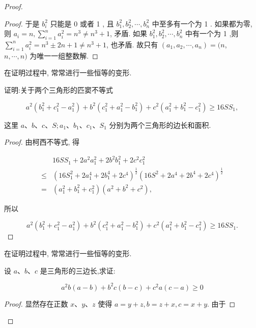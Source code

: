 \begin{proof}
\begin{proof}
	于是 $b_{i}^{2}$ 只能是 0 或者 1 , 且 $b_{1}^{2}, b_{2}^{2}, \cdots, b_{n}^{2}$ 中至多有一个为 1 . 如果都为零, 则 $a_{i}=n, \sum_{i=1}^{n} a_{i}^{2}=n^{3} \neq n^{3}+1$, 矛盾. 如果 $b_{1}^{2}, b_{2}^{2}, \cdots, b_{n}^{2}$ 中有一个为 1 ,则 $\sum_{i=1}^{n} a_{i}^{2}=n^{3} \pm 2 n+1 \neq n^{3}+1$, 也矛盾. 故只有 $\left(a_{1}, a_{2}, \cdots, a_{n}\right)=(n$,\\
	$n, \cdots, n)$ 为唯一一组整数解.
\end{proof}
\begin{note}
	在证明过程中, 常常进行一些恒等的变形.
\end{note}

\begin{example}
	证明:关于两个三角形的匹窦不等式
	
	$$
	a^{2}\left(b_{1}^{2}+c_{1}^{2}-a_{1}^{2}\right)+b^{2}\left(c_{1}^{2}+a_{1}^{2}-b_{1}^{2}\right)+c^{2}\left(a_{1}^{2}+b_{1}^{2}-c_{1}^{2}\right) \geqslant 16 S S_{1},
	$$
	
	这里 $a 、 b 、 c 、 S ; a_{1} 、 b_{1} 、 c_{1} 、 S_{1}$ 分别为两个三角形的边长和面积.
\end{example}
\begin{proof}
	由柯西不等式, 得
	
	$$
	\begin{aligned}
	& 16 S S_{1}+2 a^{2} a_{1}^{2}+2 b^{2} b_{1}^{2}+2 c^{2} c_{1}^{2} \\
	\leqslant & \left(16 S_{1}^{2}+2 a_{1}^{4}+2 b_{1}^{4}+2 c^{4}\right)^{\frac{1}{2}}\left(16 S^{2}+2 a^{4}+2 b^{4}+2 c^{4}\right)^{\frac{1}{2}} \\
	= & \left(a_{1}^{2}+b_{1}^{2}+c_{1}^{2}\right)\left(a^{2}+b^{2}+c^{2}\right),
	\end{aligned}
	$$
	
	所以
	
	$$
	a^{2}\left(b_{1}^{2}+c_{1}^{2}-a_{1}^{2}\right)+b^{2}\left(c_{1}^{2}+a_{1}^{2}-b_{1}^{2}\right)+c^{2}\left(a_{1}^{2}+b_{1}^{2}-c_{1}^{2}\right) \geqslant 16 S S_{1} .
	$$
\end{proof}
\begin{note}
	在证明过程中, 常常进行一些恒等的变形.
\end{note}

\begin{example}
	设 $a 、 b 、 c$ 是三角形的三边长,求证:
	
	$$
	a^{2} b(a-b)+b^{2} c(b-c)+c^{2} a(c-a) \geqslant 0
	$$
\end{example}
\begin{proof}
	显然存在正数 $x 、 y 、 z$ 使得 $a=y+z, b=z+x, c=x+y$. 由于
	

\end{proof}
\end{proof}
